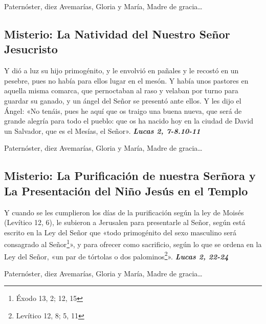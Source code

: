 \documentclass[./rosary.tex]{subfiles}
\newcounter{joyful-counter}
\begin{document}
\begin{center}
      Paternóster, diez Avemarías, Gloria y María, Madre de gracia{\ldots}
\end{center}

\bigskip

\subsection*{ Misterio: La Natividad del Nuestro Señor Jesucristo}

Y dió a luz su hijo primogénito, y le envolvió en pañales y le recostó en un pesebre, pues no había para ellos lugar en el mesón.
Y había unos pastores en aquella misma comarca, que pernoctaban al raso y velaban por turno para guardar su ganado,
y un ángel del Señor se presentó ante ellos. Y les dijo el Ángel: «No tenáis, pues he aquí que os traigo una buena nueva,
que será de grande alegría para todo el pueblo: que os ha nacido hoy en la ciudad de David un Salvador, que es el Mesías, el Señor». 
\textbf{\emph{Lucas 2, 7-8.10-11}}

\begin{center}
      Paternóster, diez Avemarías, Gloria y María, Madre de gracia{\ldots}
\end{center}

\bigskip

\subsection*{ Misterio: La Purificación de nuestra Serñora y La Presentación del Niño Jesús en el Templo}

Y cuando se les cumplieron los días de la purificación según la ley de Moisés (Levítico 12, 6),
le subieron a Jerusalen para presentarle al Señor, según está escrito en la Ley del Señor que «todo primogénito
del sexo masculino será consagrado al Señor\footnote{Éxodo 13, 2; 12, 15\label{primogenito}}», y para ofrecer como sacrificio,
según lo que se ordena en la Ley del Señor, «un par de tórtolas o dos palominos\footnote{Levítico 12, 8; 5, 11\label{sacrificio}}». 
\textbf{\emph{Lucas 2, 22-24}}

\begin{center}
      Paternóster, diez Avemarías, Gloria y María, Madre de gracia{\ldots}
\end{center}

\bigskip
\end{document}
